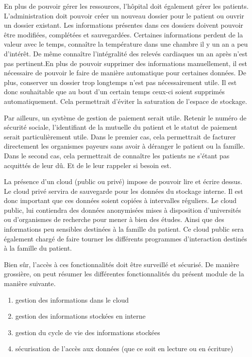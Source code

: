 En plus de pouvoir gérer les ressources, l'hôpital doit également gérer les patients. L'administration doit pouvoir créer un
nouveau dossier pour le patient ou ouvrir un dossier existant. Les informations présentes dans ces dossiers doivent pouvoir être
modifiées, complétées et sauvegardées. Certaines informations perdent de la valeur avec le temps, connaître la température dans
une chambre il y un an a peu d'intérêt. De même connaître l'intégralité des relevés cardiaques un an après n'est pas pertinent.En
plus de pouvoir supprimer des informations manuellement, il est nécessaire de pouvoir le faire de manière automatique pour
certaines données. De plus, conserver un dossier trop longtemps n'est pas nécessairement utile. Il est donc souhaitable que au
bout d'un certain temps ceux-ci soient supprimés automatiquement. Cela permettrait d'éviter la saturation de l'espace de stockage.
\newline

Par ailleurs, un système de gestion de paiement serait utile. Retenir le numéro de sécurité sociale, l'identifiant de la mutuelle
du patient et le statut de paiement serait particulièrement utile. Dans le premier cas, cela permettrait de facturer directement
les organismes payeurs sans avoir à déranger le patient ou la famille. Dans le second cas, cela permettrait de connaître les
patients ne s'étant pas acquittés de leur dû. Et de le leur rappeler si besoin est.
\newline

La présence d'un cloud (public ou privé) impose de pouvoir lire et écrire dessus. Le cloud privé servira de sauvegarde pour les
données du stockage interne. Il est donc important que ces données soient copiées à intervalles réguliers. Le cloud public, lui
contiendra des données anonymisées mises à disposition d'universités ou d'organismes de recherche pour mener à bien des études.
Ainsi que des informations peu sensibles destinées à la famille du patient. Ce cloud public sera également chargé de faire tourner
les différents programmes d'interaction destinés à la famille du patient.

Bien sûr, l'accès à ces fonctionnalités doit être surveillé et sécurisé. De manière grossière, on peut résumer les différentes
fonctionnalités du présent module de la manière suivante.
\begin{enumerate}
    \item gestion des informations dans le cloud
    \item gestion des informations stockées en interne
    \item gestion du cycle de vie des informations stockées
    \item sécurisation de l'accès aux données (que ce soit en lecture ou en écriture)
\end{enumerate}
